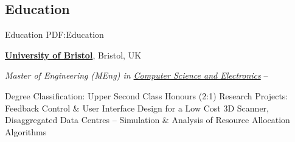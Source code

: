 \documentclass[a4paper,10pt,oneside]{article}
\begin{document}
\begin{body}


\section
{Education}
{Education}
{PDF:Education}

\href{http://www.bristol.ac.uk/}
{\textbf{University of Bristol}},
Bristol, UK

\EntryGapNoBreak
\textit{Master of Engineering (MEng) in
\href{http://www.bristol.ac.uk/engineering/departments/eeng/}
{Computer Science and Electronics}}
\hfill
{} --
\begin{detail}
\BulletItem
Degree Classification: Upper Second Class Honours (2:1)
\BulletItem
Research Projects: Feedback Control \& User Interface Design for a Low Cost 3D Scanner, Disaggregated Data Centres -- Simulation \& Analysis of Resource Allocation Algorithms
\end{detail}


\end{body}
\end{document}
